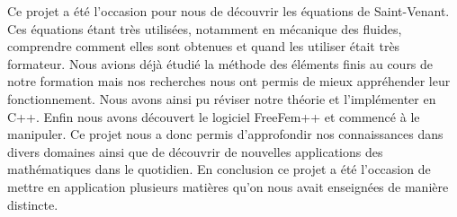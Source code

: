 Ce projet a été l’occasion pour nous de découvrir les équations de Saint-Venant. Ces équations étant très utilisées, notamment en mécanique des fluides, comprendre comment elles sont obtenues et quand les utiliser était très formateur. Nous avions déjà étudié la méthode des éléments finis au cours de notre formation mais nos recherches nous ont permis de mieux appréhender leur fonctionnement. Nous avons ainsi pu réviser notre théorie et l’implémenter en C++. Enfin nous avons découvert le logiciel FreeFem++ et commencé à le manipuler. Ce projet nous a donc permis d’approfondir nos connaissances dans divers domaines ainsi que de découvrir de nouvelles applications des mathématiques dans le quotidien. En conclusion ce projet a été l’occasion de mettre en application plusieurs matières qu’on nous avait enseignées de manière distincte.
